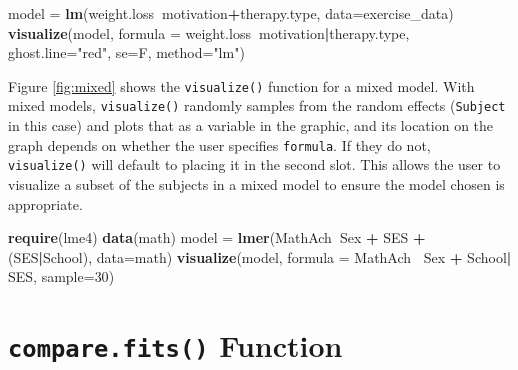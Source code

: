 \documentclass[,]{book}
\newenvironment{Shaded}{\begin{snugshade}}{\end{snugshade}}
\newcommand{\KeywordTok}[1]{\textcolor[rgb]{0.13,0.29,0.53}{\textbf{#1}}}
\newcommand{\DataTypeTok}[1]{\textcolor[rgb]{0.13,0.29,0.53}{#1}}
\newcommand{\DecValTok}[1]{\textcolor[rgb]{0.00,0.00,0.81}{#1}}
\newcommand{\StringTok}[1]{\textcolor[rgb]{0.31,0.60,0.02}{#1}}
\newcommand{\OperatorTok}[1]{\textcolor[rgb]{0.81,0.36,0.00}{\textbf{#1}}}
\newcommand{\NormalTok}[1]{#1}
\begin{document}
\begin{Shaded}
\begin{Highlighting}[]
\NormalTok{model =}\StringTok{ }\KeywordTok{lm}\NormalTok{(weight.loss}\OperatorTok{~}\NormalTok{motivation}\OperatorTok{+}\NormalTok{therapy.type, }\DataTypeTok{data=}\NormalTok{exercise_data)}
\KeywordTok{visualize}\NormalTok{(model, }\DataTypeTok{formula =}\NormalTok{ weight.loss}\OperatorTok{~}\NormalTok{motivation}\OperatorTok{|}\NormalTok{therapy.type, }
          \DataTypeTok{ghost.line=}\StringTok{"red"}\NormalTok{, }\DataTypeTok{se=}\NormalTok{F, }\DataTypeTok{method=}\StringTok{"lm"}\NormalTok{)}
\end{Highlighting}
\end{Shaded}

Figure \ref{fig:mixed} shows the \texttt{visualize()} function for a
mixed model. With mixed models, \texttt{visualize()} randomly samples
from the random effects (\texttt{Subject} in this case) and plots that
as a variable in the graphic, and its location on the graph depends on
whether the user specifies \texttt{formula}. If they do not,
\texttt{visualize()} will default to placing it in the second slot. This
allows the user to visualize a subset of the subjects in a mixed model
to ensure the model chosen is appropriate.

\begin{Shaded}
\begin{Highlighting}[]
\KeywordTok{require}\NormalTok{(lme4)}
\KeywordTok{data}\NormalTok{(math)}
\NormalTok{model =}\StringTok{ }\KeywordTok{lmer}\NormalTok{(MathAch}\OperatorTok{~}\NormalTok{Sex }\OperatorTok{+}\StringTok{ }\NormalTok{SES }\OperatorTok{+}\StringTok{ }\NormalTok{(SES}\OperatorTok{|}\NormalTok{School), }\DataTypeTok{data=}\NormalTok{math)}
\KeywordTok{visualize}\NormalTok{(model, }
  \DataTypeTok{formula =}\NormalTok{ MathAch}\OperatorTok{~}\StringTok{ }\NormalTok{Sex }\OperatorTok{+}\StringTok{ }\NormalTok{School}\OperatorTok{|}\StringTok{ }\NormalTok{SES, }
  \DataTypeTok{sample=}\DecValTok{30}\NormalTok{)}
\end{Highlighting}
\end{Shaded}

\section*{\texorpdfstring{\texttt{compare.fits()}
Function}{compare.fits() Function}}\label{compare.fits-function}
\end{document}
